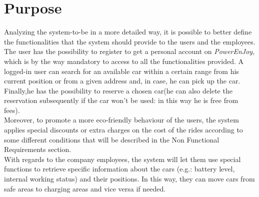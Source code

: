 \documentclass[11pt,a4paper]{report}
\begin{document}
\section{Purpose}
Analyzing the system-to-be in a more detailed way, it is possible to better define the functionalities that the system should provide to the users and the employees.\\
The user has the possibility to register to get a personal account on \textit{PowerEnJoy}, which is by the way mandatory to access to all the functionalities provided. A logged-in user can search for an available car within a certain range from his current position or from a given address and, in case, he can pick up the car. Finally,he has the possibility to reserve a chosen car(he can also delete the reservation subsequently if the car won't be used: in this way he is free from fees).\\
Moreover, to promote a more eco-friendly behaviour of the users, the system applies special discounts or extra charges on the cost of the rides according to some different conditions that will be described in the Non Functional Requirements section.\\ 
With regards to the company employees, the system will let them use special functions to retrieve specific information about the cars (e.g.: battery level, internal working status) and their positions. In this way, they can move cars from safe areas to charging areas and vice versa if needed.
\end{document}
